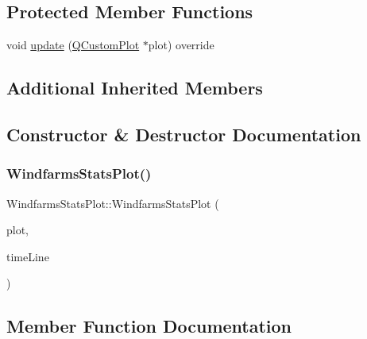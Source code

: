 \subsection*{Protected Member Functions}
\begin{DoxyCompactItemize}
\item 
void \mbox{\hyperlink{class_windfarms_stats_plot_ac92ec0f10052bb5322de99ddf595468b}{update}} (\mbox{\hyperlink{class_q_custom_plot}{Q\+Custom\+Plot}} $\ast$plot) override
\end{DoxyCompactItemize}
\subsection*{Additional Inherited Members}


\subsection{Constructor \& Destructor Documentation}
\mbox{\label{class_windfarms_stats_plot_a5b9f0d5bb65f52fd4f38acbdbef508be}} 
\subsubsection{\texorpdfstring{WindfarmsStatsPlot()}{WindfarmsStatsPlot()}}
{\footnotesize\ttfamily Windfarms\+Stats\+Plot\+::\+Windfarms\+Stats\+Plot (\begin{DoxyParamCaption}\item[{\mbox{\hyperlink{class_q_custom_plot}{Q\+Custom\+Plot}} $\ast$}]{plot,  }\item[{\mbox{\hyperlink{class_q_c_p_item_line}{Q\+C\+P\+Item\+Line}} $\ast$}]{time\+Line }\end{DoxyParamCaption})}



\subsection{Member Function Documentation}
\mbox{\label{class_windfarms_stats_plot_a4298f28b66931c4611562601d754fb7b}} 
